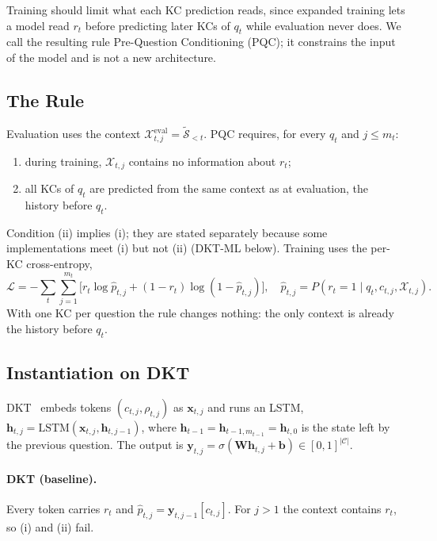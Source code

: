Training should limit what each KC prediction reads, since expanded training lets a model read $r_t$ before predicting later KCs of $q_t$ while evaluation never does. We call the resulting rule Pre-Question Conditioning (PQC); it constrains the input of the model and is not a new architecture.

\subsection{The Rule}
\label{subsec:rule-def}
Evaluation uses the context $\mathcal{X}^{\mathrm{eval}}_{t,j}=\tilde{\mathcal{S}}_{<t}$. PQC requires, for every $q_t$ and $j\le m_t$:
\begin{enumerate}
  \item[(i)] during training, $\mathcal{X}_{t,j}$ contains no information about $r_t$;
  \item[(ii)] all KCs of $q_t$ are predicted from the same context as at evaluation, the history before $q_t$.
\end{enumerate}
Condition (ii) implies (i); they are stated separately because some implementations meet (i) but not (ii) (DKT-ML below). Training uses the per-KC cross-entropy,
\begin{equation}
  \mathcal{L}=-\sum_{t}\sum_{j=1}^{m_t}\big[r_t\log\hat p_{t,j}+(1-r_t)\log(1-\hat p_{t,j})\big],\quad
  \hat p_{t,j}=P(r_t=1\mid q_t,c_{t,j},\mathcal{X}_{t,j}).
  \label{eq:loss}
\end{equation}
With one KC per question the rule changes nothing: the only context is already the history before $q_t$.

\subsection{Instantiation on DKT}
\label{subsec:ins-dkt}
DKT~\cite{piech2015deep} embeds tokens $(c_{t,j},\rho_{t,j})$ as $\mathbf{x}_{t,j}$ and runs an LSTM, $\mathbf{h}_{t,j}=\mathrm{LSTM}(\mathbf{x}_{t,j},\allowbreak\mathbf{h}_{t,j-1})$, where $\mathbf{h}_{t-1}=\mathbf{h}_{t-1,m_{t-1}}=\mathbf{h}_{t,0}$ is the state left by the previous question. The output is $\mathbf{y}_{t,j}=\sigma(\mathbf{W}\mathbf{h}_{t,j}+\mathbf{b})\in[0,1]^{|\mathcal{C}|}$.

\paragraph{DKT (baseline).} Every token carries $r_t$ and $\hat p_{t,j}=\mathbf{y}_{t,j-1}[c_{t,j}]$. For $j>1$ the context contains $r_t$, so (i) and (ii) fail.

